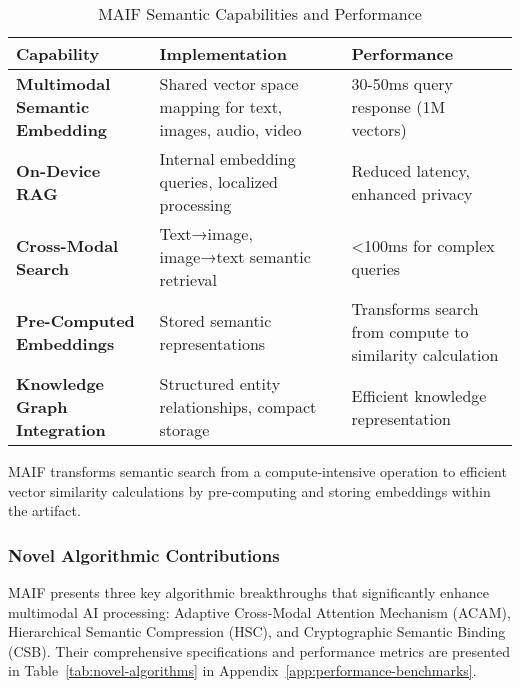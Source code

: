 \documentclass[conference]{IEEEtran}
\begin{document}
\begin{table*}[!t]
\renewcommand{\arraystretch}{1.3}
\caption{MAIF Semantic Capabilities and Performance}
\label{tab:semantic-capabilities}
\centering
\footnotesize
\begin{tabular}{p{3.5cm}p{5cm}p{4.5cm}}
\toprule
\textbf{Capability} & \textbf{Implementation} & \textbf{Performance} \\
\midrule
\textbf{Multimodal Semantic Embedding} & Shared vector space mapping for text, images, audio, video & 30-50ms query response (1M vectors) \\
\textbf{On-Device RAG} & Internal embedding queries, localized processing & Reduced latency, enhanced privacy \\
\textbf{Cross-Modal Search} & Text→image, image→text semantic retrieval & <100ms for complex queries \\
\textbf{Pre-Computed Embeddings} & Stored semantic representations & Transforms search from compute to similarity calculation \\
\textbf{Knowledge Graph Integration} & Structured entity relationships, compact storage & Efficient knowledge representation \\
\bottomrule
\end{tabular}
\end{table*}

MAIF transforms semantic search from a compute-intensive operation to efficient vector similarity calculations by pre-computing and storing embeddings within the artifact.


\subsubsection{Novel Algorithmic Contributions}
MAIF presents three key algorithmic breakthroughs that significantly enhance multimodal AI processing: Adaptive Cross-Modal Attention Mechanism (ACAM), Hierarchical Semantic Compression (HSC), and Cryptographic Semantic Binding (CSB). Their comprehensive specifications and performance metrics are presented in Table~\ref{tab:novel-algorithms} in Appendix~\ref{app:performance-benchmarks}.
\end{document}
